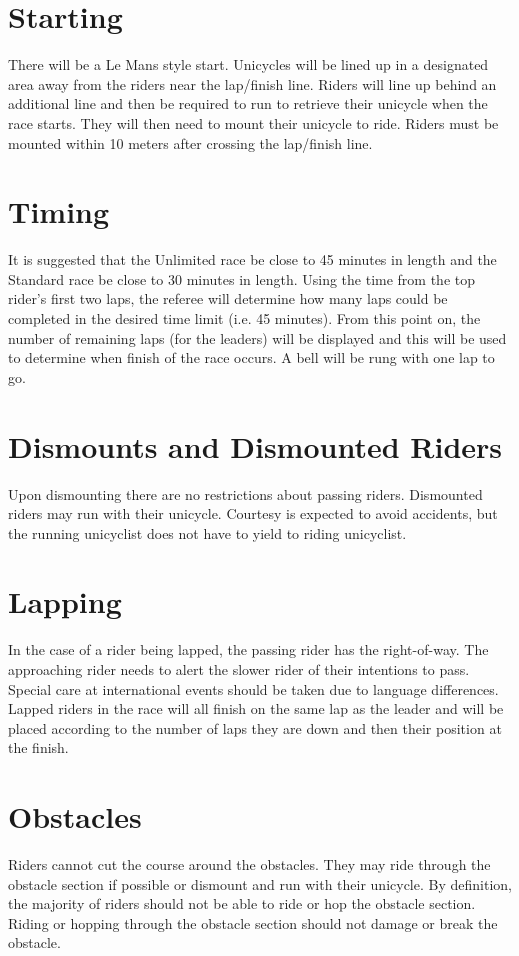 \section{Starting}
There will be a Le Mans style start.
Unicycles will be lined up in a designated area away from the riders near the lap/finish line.
Riders will line up behind an additional line and then be required to run to retrieve their unicycle when the race starts.
They will then need to mount their unicycle to ride.
Riders must be mounted within 10 meters after crossing the lap/finish line.

\section{Timing}
It is suggested that the Unlimited race be close to 45 minutes in length and the Standard race be close to 30 minutes in length.
Using the time from the top rider's first two laps, the referee will determine how many laps could be completed in the desired time limit (i.e. 45 minutes).
From this point on, the number of remaining laps (for the leaders) will be displayed and this will be used to determine when finish of the race occurs. A bell will be rung with one lap to go.

\section{Dismounts and Dismounted Riders}
Upon dismounting there are no restrictions about passing riders.
Dismounted riders may run with their unicycle.
Courtesy is expected to avoid accidents, but the running unicyclist does not have to yield to riding unicyclist.

\section{Lapping}
In the case of a rider being lapped, the passing rider has the right-of-way.
The approaching rider needs to alert the slower rider of their intentions to pass.
Special care at international events should be taken due to language differences.
Lapped riders in the race will all finish on the same lap as the leader and will be placed according to the number of laps they are down and then their position at the finish.

\section{Obstacles}
Riders cannot cut the course around the obstacles.
They may ride through the obstacle section if possible or dismount and run with their unicycle.
By definition, the majority of riders should not be able to ride or hop the obstacle section.
Riding or hopping through the obstacle section should not damage or break the obstacle.

